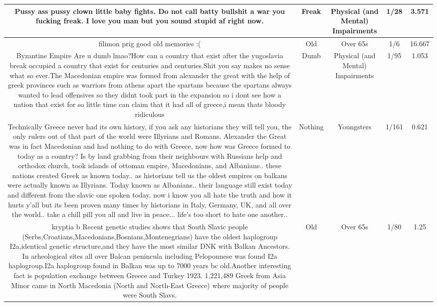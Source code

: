 \documentclass[11pt]{article}
\newlength\mylength
\begin{document}
\begin{center}
\begin{longtable}{|C{.40\mylength}|C{.30\mylength}|C{.15\mylength}|C{.15\mylength}|C{.15\mylength}|}
  Pussy ass pussy clown little baby fights. Do not call batty bullshit a war you fucking freak. I love you man but you sound stupid af right now.  & Freak & Physical (and Mental) Impairments & 1/28 & 3.571 \\  \hline
   filimon prig good old memories :(  & Old & Over 65s & 1/6 & 16.667 \\  \hline
   Byzantine Empire Are u dumb lmao?How can a country that exist after the yugoslavia break occupied a country that exist for centuries and centuries.Shit you say makes no sense what so ever.The  Macedonian empire  was formed from alexander the great with the help of greek provinces such as warriors from athens apart the spartans because the spartans always wanted to lead offensives so they didnt took part in the expansion so i dont see how a nation that exist for so little time can claim that it  had  all of greece,i mean thats bloody ridiculous  & Dumb & Physical (and Mental) Impairments & 1/95 & 1.053 \\  \hline
  Technically Greece never had its own history, if you ask any historians they will tell you, the only rulers out of that part of the world were Illyrians and Romans. Alexander the Great was in fact Macedonian and had nothing to do with Greece, now how was Greece formed to today as a country? Is by land grabbing from their neighbours with Russians help and orthodox church, took islands of ottoman empire, Macedonians, and Albanians.. these nations created Greek as known today.. as historians tell us the oldest empires on balkans were actually known as Illyrians. Today known as Albanians.. their language still exist today and different from the slavic one spoken today. now i know you all hate the truth and how it hurts y'all but its been proven many times by historians in Italy, Germany, UK, and all over the world.. take a chill pill you all and live in peace... life's too short to hate one another..    & Nothing & Youngsters & 1/161 & 0.621 \\  \hline
   kryptia b Recent genetic studies shows that  South Slavic people (Serbs,Croatians,Macedonians,Bosnians,Montenegrians) have the oldest haplogroup I2a,identical genetic structure,and they have the most similar DNK with Balkan Ancestors. In arheological sites all over Balcan penincula including Peloponnese was found I2a haplogroup.I2a haplogroup found in Balkan was up to 7000 years bc old.Another interesting fact is population exchange between Greece and Turkey 1923. 1,221,489 Greek from Asia Minor came in  North Macedonia (North and North-East Greece) where majority of people were  South Slavs.  & Old & Over 65s & 1/80 & 1.25 \\  \hline

\end{longtable}
\end{center}
\end{document}
